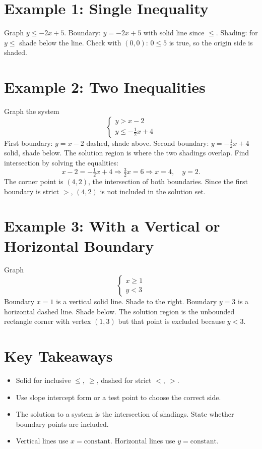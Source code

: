\documentclass[14pt]{extarticle}
\begin{document}
\section*{Example 1: Single Inequality}

Graph \(y \le -2x + 5\).  
Boundary: \(y = -2x + 5\) with solid line since \(\le\).  
Shading: for \(y \le\) shade below the line.  
Check with \((0,0)\): \(0 \le 5\) is true, so the origin side is shaded.

\section*{Example 2: Two Inequalities}

Graph the system
\[
\begin{cases}
y > x - 2\\
y \le -\tfrac{1}{2}x + 4
\end{cases}
\]
First boundary: \(y = x - 2\) dashed, shade above.  
Second boundary: \(y = -\tfrac{1}{2}x + 4\) solid, shade below.  
The solution region is where the two shadings overlap.  
Find intersection by solving the equalities:
\[
x - 2 = -\tfrac{1}{2}x + 4 \Rightarrow \tfrac{3}{2}x = 6 \Rightarrow x = 4,\quad y = 2.
\]
The corner point is \((4,2)\), the intersection of both boundaries. Since the first boundary is strict \(>\), \((4,2)\) is not included in the solution set.

\section*{Example 3: With a Vertical or Horizontal Boundary}

Graph
\[
\begin{cases}
x \ge 1\\
y < 3
\end{cases}
\]
Boundary \(x=1\) is a vertical solid line. Shade to the right.  
Boundary \(y=3\) is a horizontal dashed line. Shade below.  
The solution region is the unbounded rectangle corner with vertex \((1,3)\) but that point is excluded because \(y<3\).

\section*{Key Takeaways}
\begin{itemize}
    \item Solid for inclusive \(\le,\ \ge\), dashed for strict \(<,\ >\).
    \item Use slope intercept form or a test point to choose the correct side.
    \item The solution to a system is the intersection of shadings. State whether boundary points are included.
    \item Vertical lines use \(x=\text{constant}\). Horizontal lines use \(y=\text{constant}\).
\end{itemize}
\end{document}
